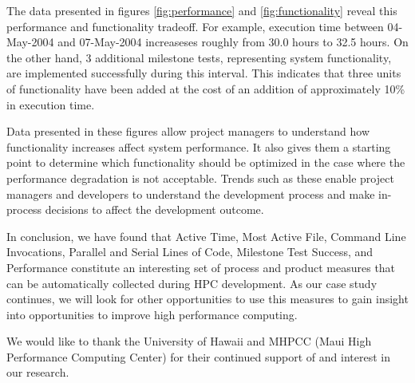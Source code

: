 \documentclass[10pt,twocolumn]{article}
\begin{document}
The data presented in figures \ref{fig:performance} and
\ref{fig:functionality} reveal this
performance and functionality tradeoff.  For example, execution time
between 04-May-2004 and 07-May-2004 increaseses roughly from 30.0
hours to 32.5 hours.  On the other hand, 3 additional milestone tests,
representing system functionality, are implemented successfully during
this interval.  This indicates that three units of functionality have been
added at the cost of an addition of approximately 10\% in execution time.

Data presented in these figures allow project managers to understand
how functionality increases affect system performance.  It also gives
them a starting point to determine which functionality should be
optimized in the case where the performance degradation is not
acceptable.  Trends such as these enable project managers and
developers to understand the development process and make in-process
decisions to affect the development outcome.

In conclusion, we have found that Active Time, Most Active File, Command
Line Invocations, Parallel and Serial Lines of Code, Milestone Test
Success, and Performance constitute an interesting set of process and
product measures that can be automatically collected during HPC
development.  As our case study continues, we will look for other
opportunities to use this measures to gain insight into opportunities to
improve high performance computing.

\label{sec:acknowledgements}
We would like to thank the University of Hawaii and MHPCC (Maui High Performance Computing Center) for their continued support of and interest in our research.
 


\end{document}
